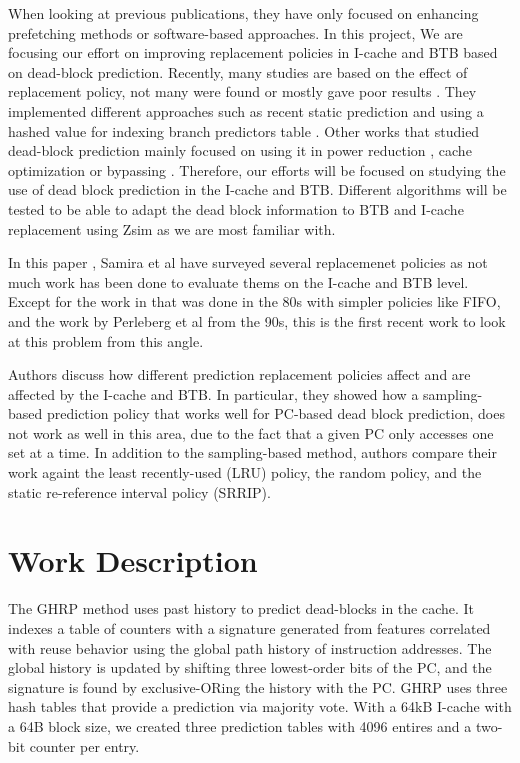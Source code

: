 \documentclass[11pt]{article}
\begin{document}
When looking at previous publications, they have only focused on enhancing prefetching methods or software-based approaches. In this project, We are focusing our 
effort on improving replacement policies in I-cache and BTB based on dead-block prediction. Recently, many studies are based on the effect of replacement policy, not many were found or mostly gave poor results \cite{ship-micro-2011, ISCA-2006} . They implemented different approaches such as recent static prediction \cite{rrip-2010} and using a hashed value for indexing branch predictors table \cite{acm-2005}. Other works that studied dead-block prediction mainly focused on using it in power reduction \cite{IATAC-2005}, cache optimization \cite{ieeeCAT-2000} or bypassing \cite{johnson-1999}. Therefore, our efforts will be focused on studying the use of dead block prediction
in the I-cache and BTB. Different algorithms will be tested to be able to adapt the dead block information to BTB and I-cache replacement using Zsim as we are most familiar with.  

In this paper \cite{samira-ISCA18}, Samira et al have surveyed several replacemenet policies as not much work has been done to evaluate thems on the I-cache and BTB level. Except for the work in \cite{smith-1985} that was done in the 80s with simpler policies like FIFO, and the work by Perleberg et al \cite{perleberg-1993} from the 90s, this is the first recent work to look at this problem from this angle.

Authors discuss how different prediction replacement policies affect and are affected by the I-cache and BTB. In particular, they showed how a sampling-based
prediction policy that works well for PC-based dead block prediction, does not work as well in this area, due to the fact that a given PC only accesses one set at a time.
In addition to the sampling-based method, authors compare their work againt the least recently-used (LRU) policy, the random policy, and the static re-reference interval policy (SRRIP).


\section{Work Description}
\label{sec:Work Description}
The GHRP method uses past history to predict dead-blocks in the cache.
It indexes a table of counters with a signature generated from features correlated with reuse behavior using the global path history
of instruction addresses.
The global history is updated by shifting three lowest-order bits of the PC, and the signature is found by exclusive-ORing the history with the PC.
GHRP uses three hash tables that provide a prediction via majority vote.
With a 64kB I-cache with a 64B block size, we created three prediction tables with 4096 entires and a two-bit counter per entry.
\par
\end{document}

